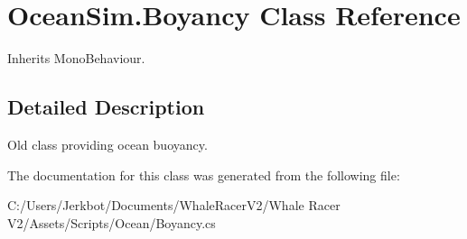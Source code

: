 \hypertarget{class_ocean_sim_1_1_boyancy}{}\section{Ocean\+Sim.\+Boyancy Class Reference}
\label{class_ocean_sim_1_1_boyancy}


Inherits Mono\+Behaviour.



\subsection{Detailed Description}
Old class providing ocean buoyancy. 



The documentation for this class was generated from the following file\+:\begin{DoxyCompactItemize}
\item 
C\+:/\+Users/\+Jerkbot/\+Documents/\+Whale\+Racer\+V2/\+Whale Racer V2/\+Assets/\+Scripts/\+Ocean/Boyancy.\+cs\end{DoxyCompactItemize}
